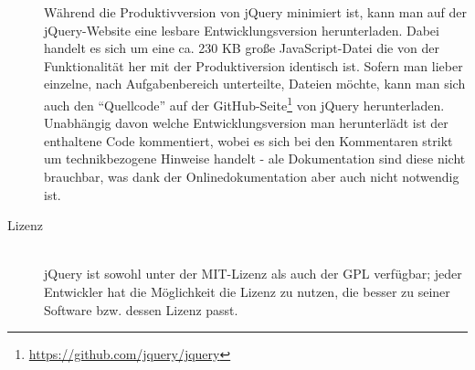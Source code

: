 \begin{description}
Während die Produktivversion von jQuery minimiert ist, kann man auf der jQuery-Website eine lesbare
Entwicklungsversion herunterladen. Dabei handelt es sich um eine ca. 230 KB große JavaScript-Datei
die von der Funktionalität her mit der Produktiversion identisch ist. Sofern man lieber einzelne,
nach Aufgabenbereich unterteilte, Dateien möchte, kann man sich auch den \enquote{Quellcode} auf der
GitHub-Seite\footnote{\href{https://github.com/jquery/jquery}{https://github.com/jquery/jquery}} von
jQuery herunterladen. Unabhängig davon welche Entwicklungsversion man herunterlädt ist der
enthaltene Code kommentiert, wobei es sich bei den Kommentaren strikt um technikbezogene Hinweise
handelt - ale Dokumentation sind diese nicht brauchbar, was dank der Onlinedokumentation aber auch
nicht notwendig ist.

\item[Lizenz] \hfill \\
jQuery ist sowohl unter der MIT-Lizenz als auch der GPL verfügbar; jeder Entwickler hat die
Möglichkeit die Lizenz zu nutzen, die besser zu seiner Software bzw. dessen Lizenz passt.
\end{description}


